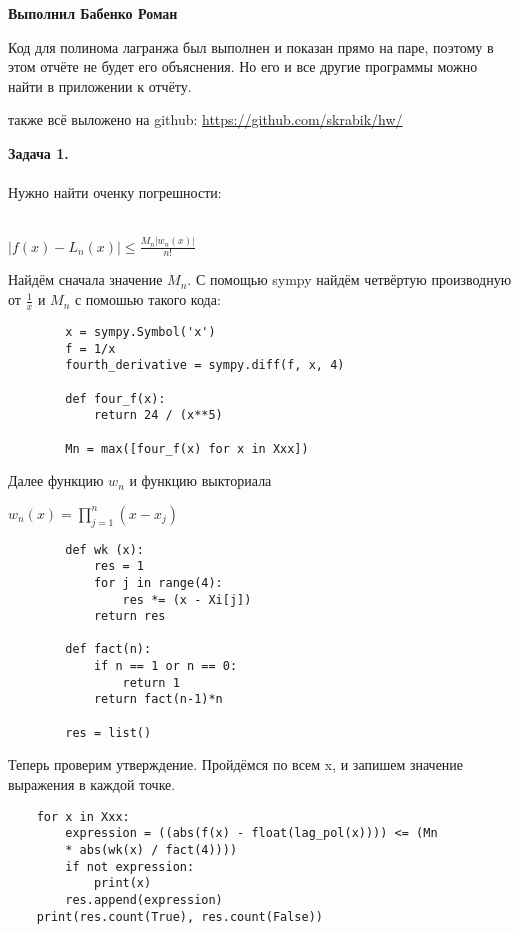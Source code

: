 \documentclass[letterpaper,12pt]{article}
\begin{document}
\begin{center}
    
    \textbf{\Huge Выполнил Бабенко Роман}

  \end{center}
  
  Код для полинома лагранжа был выполнен и показан 
  прямо на паре, поэтому в этом отчёте не будет 
  его объяснения. Но его и все другие программы 
  можно найти в приложении к отчёту.

  также всё выложено на github: \href{https://github.com/skrabik/hw/}{https://github.com/skrabik/hw/}

  \textbf{Задача 1.}
 \\~\\
  Нужно найти оченку погрешности:
    \\~\\
   \begin{center} $|f(x)-L_n(x)| \leq \frac{M_n|w_n(x)|}{n!}$
    
   \end{center}


    Найдём сначала значение $M_n$.
    С помощью sympy найдём четвёртую производную
    от $\frac{1}{x}$ и $M_n$
    с помошью такого кода: 
    \begin{lstlisting}
        x = sympy.Symbol('x')
        f = 1/x
        fourth_derivative = sympy.diff(f, x, 4)

        def four_f(x):
            return 24 / (x**5)

        Mn = max([four_f(x) for x in Xxx])
    \end{lstlisting}

    Далее функцию $w_n$ и функцию выкториала

    \begin{center}
        $w_n(x) = \prod_{j=1}^{n}(x-x_{j})$
    \end{center}

    \begin{lstlisting}
        def wk (x):
            res = 1
            for j in range(4):
                res *= (x - Xi[j])
            return res

        def fact(n):
            if n == 1 or n == 0:
                return 1
            return fact(n-1)*n

        res = list()
    \end{lstlisting}

    Теперь проверим утверждение. Пройдёмся по 
    всем x, и запишем значение выражения в 
    каждой точке.
    \begin{lstlisting}
    for x in Xxx:
        expression = ((abs(f(x) - float(lag_pol(x)))) <= (Mn 
        * abs(wk(x) / fact(4))))
        if not expression:
            print(x)
        res.append(expression)
    print(res.count(True), res.count(False))
    \end{lstlisting}
\end{document}
